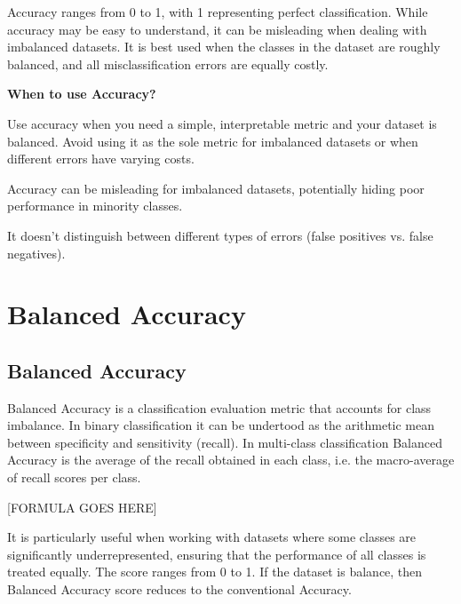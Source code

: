 Accuracy ranges from 0 to 1, with 1 representing perfect classification. While accuracy may be easy to understand, it can be misleading when dealing with imbalanced datasets.
It is best used when the classes in the dataset are roughly balanced, and all misclassification errors are equally costly.

\textbf{When to use Accuracy?}

Use accuracy when you need a simple, interpretable metric and your dataset is balanced. Avoid using it as the sole metric for imbalanced datasets or when different errors have varying costs.

{
\item Accuracy can be misleading for imbalanced datasets, potentially hiding poor performance in minority classes.
\item It doesn't distinguish between different types of errors (false positives vs. false negatives).
}

\clearpage
\thispagestyle{classificationstyle}
\section{Balanced Accuracy}
\subsection{Balanced Accuracy}

Balanced Accuracy is a classification evaluation metric that accounts for class imbalance. In binary classification it can be undertood as the arithmetic mean between
specificity and sensitivity (recall). In multi-class classification Balanced Accuracy is the average of the recall obtained in each class, i.e. the macro-average of recall scores per class.

\begin{center}
    [FORMULA GOES HERE]
\end{center}

It is particularly useful when working with datasets where some classes are significantly underrepresented, ensuring that the performance of all classes is treated equally.
The score ranges from 0 to 1. If the dataset is balance, then Balanced Accuracy score reduces to the conventional Accuracy.

